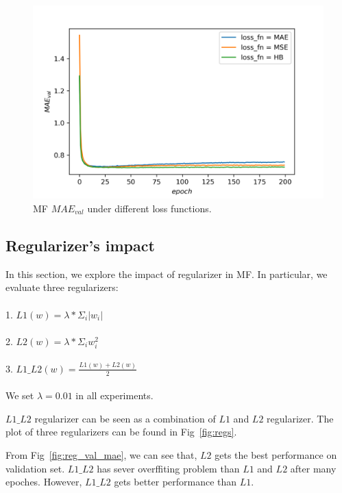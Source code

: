 \documentclass[journal, a4paper]{IEEEtran}
\begin{document}
\begin{figure}[!hbt]
	\begin{center}
		\includegraphics[width=\columnwidth]{loss_val_mae}
		\caption{MF $MAE_{val}$ under different loss functions.}
		\label{fig:loss_val_mae}
	\end{center}
\end{figure} \par


\subsection{Regularizer's impact}
In this section, we explore the impact of regularizer in MF. In particular, we evaluate three regularizers: \\ \\
1. $L1(w) = \lambda * \Sigma_{i} |w_i| $ \\ \\
2. $L2(w) = \lambda * \Sigma_{i} w_i^2 $ \\ \\
3. $L1\_L2(w) = \frac{L1(w) + L2(w)}{2}  $ \\ \\
We set $\lambda = 0.01$ in all experiments. \par
$L1\_L2$ regularizer can be seen as a combination of $L1$ and $L2$ regularizer. The plot of three regularizers can be found in Fig~\ref{fig:regs}.\par
From Fig~\ref{fig:reg_val_mae}, we can see that, $L2$ gets the best performance on validation set. $L1\_L2$ has sever overffiting problem than $L1$ and $L2$ after many epoches. However, $L1\_L2$ gets better performance than $L1$.  \par
\end{document}
